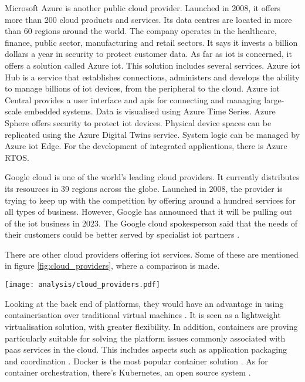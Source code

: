Microsoft Azure \cite{microsoft_azure} is another public \gls{cloud} provider. Launched in 2008, it offers more than 200 \gls{cloud} products and services. Its data centres are located in more than 60 regions around the world. The company operates in the healthcare, finance, public sector, manufacturing and retail sectors. It says it invests a billion dollars a year in security to protect customer data. As far as \acrshort{iot} is concerned, it offers a solution called Azure \acrshort{iot}. This solution includes several services. Azure \acrshort{iot} Hub is a service that establishes connections, administers and develops the ability to manage billions of \acrshort{iot} devices, from the peripheral to the \gls{cloud}. Azure \acrshort{iot} Central provides a user interface and \acrshort{api}s for connecting and managing large-scale embedded systems. Data is visualised using Azure Time Series. Azure Sphere offers security to protect \acrshort{iot} devices. Physical device spaces can be replicated using the Azure Digital Twins service. System logic can be managed by Azure \acrshort{iot} Edge. For the development of integrated applications, there is Azure RTOS. \cite{microsoft_azure}

Google \Gls{cloud} \cite{google_cloud} is one of the world's leading \gls{cloud} providers. It currently distributes its resources in 39 regions across the globe. Launched in 2008, the provider is trying to keep up with the competition by offering around a hundred services for all types of business. However, Google has announced that it will be pulling out of the \acrshort{iot} business in 2023. The Google \Gls{cloud} spokesperson said that the needs of their customers could be better served by specialist \acrshort{iot} partners \cite{akenza_google_cloud_iot}.

There are other \gls{cloud} providers offering \acrshort{iot} services. Some of these are mentioned in figure \ref{fig:cloud_providers}, where a comparison is made.
\begin{center}
    \begingroup
    \texttt{[image: analysis/cloud\_providers.pdf]}
    \label{fig:cloud_providers}
    \endgroup
\end{center}
Looking at the back end of platforms, they would have an advantage in using containerisation over traditional virtual machines \cite{container_cloud_platform}. It is seen as a lightweight virtualisation solution, with greater flexibility. In addition, containers are proving particularly suitable for solving the platform issues commonly associated with \acrshort{paas} services in the \gls{cloud}. This includes aspects such as application packaging and coordination \cite{container_cloud_platform}. Docker is the most popular container solution \cite{docker}. As for container orchestration, there's Kubernetes, an open source system \cite{k8s}.


